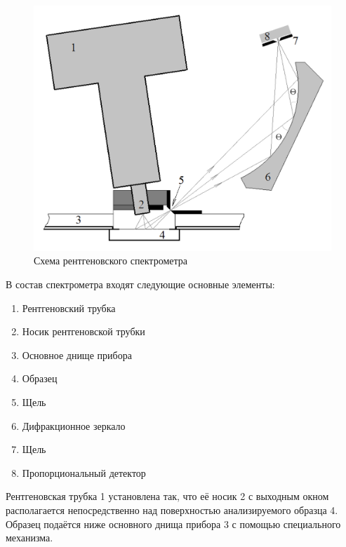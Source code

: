\documentclass[a4paper, 12pt]{article}%
\begin{document}
		\begin{figure}[h!]
			\centering
			\includegraphics[scale=0.45]{Схема_установки.png}
			\caption{Схема рентгеновского спектрометра}
		\end{figure}				
				
		В состав спектрометра входят следующие основные элементы: 
				
		\begin{enumerate}
				
			\item Рентгеновский трубка
					
			\item Носик рентгеновской трубки
					
			\item Основное днище прибора
		
			\item Образец
					
			\item Щель
		
			\item Дифракционное зеркало
			
			\item Щель
					
			\item Пропорциональный детектор
		
		\end{enumerate}
				
		Рентгеновская трубка 1 установлена так,  что её носик 2 с выходным окном располагается непосредственно над поверхностью анализируемого образца 4.  Образец подаётся ниже основного днища прибора 3 с помощью специального механизма.  
				
\end{document}
